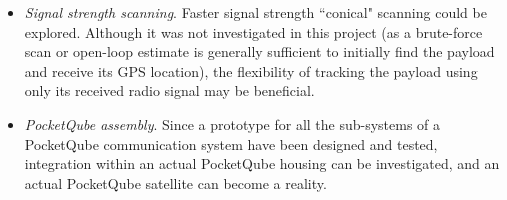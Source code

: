 \begin{itemize}
    \item \textit{Signal strength scanning}. Faster signal strength ``conical" scanning could be explored. Although it was not investigated in this project (as a brute-force scan or open-loop estimate is generally sufficient to initially find the payload and receive its GPS location), the flexibility of tracking the payload using only its received radio signal may be beneficial.
    \item \textit{PocketQube assembly}. Since a prototype for all the sub-systems of a PocketQube communication system have been designed and tested, integration within an actual PocketQube housing can be investigated, and an actual PocketQube satellite can become a reality.
\end{itemize}